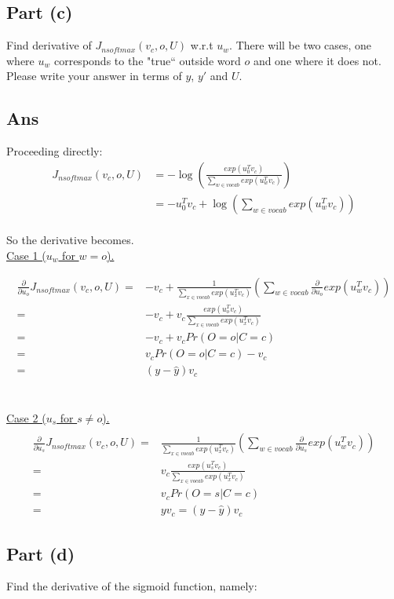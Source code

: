 \documentclass{article}
\begin{document}
\subsection*{Part (c)}
Find derivative of $J_{nsoftmax}(v_c, o, U)$ w.r.t $u_w$. There will be two cases, one where $u_w$ corresponds to the "true`` outside word $o$ and one where it does not. Please write your answer in terms of $y$, $y'$ and $U$.

\subsection*{Ans}
Proceeding directly:
\begin{align*}J_{nsoftmax}(v_c, o, U) &= -\log \left( \frac{exp(u_0^T v_c)}{\sum_{w \in vocab} exp(u_w^T v_c)  }    \right) \\
&= -u_0^T v_c + \log \left(\sum_{w \in vocab} exp(u_w^T v_c) \right)
\end{align*}
\\ So the derivative becomes.
\\ \underline{Case 1 ($u_w$ for $w=o$).} 

\begin{align*}
\frac{\partial}{\partial u_o} J_{nsoftmax}(v_c, o, U) =& - v_c + \frac{1}{\sum_{x \in vocab} exp(u_x^T v_c)}\left(\sum_{w \in vocab} \frac{\partial}{\partial u_o} exp(u_w^T v_c) \right) \\
=&-v_c + v_c \frac{exp(u_o^T v_c)}{\sum_{x \in vocab} exp(u_x^T v_c)} \\
=& -v_c + v_c Pr(O = o | C = c) \\
=& v_c Pr(O = o | C = c) -v_c \\
=&  (y - \hat{y}) v_c
\end{align*} \\
\\
\underline{Case 2 ($u_s$ for $s \neq o$).} 
\begin{align*}
\\
\frac{\partial}{\partial u_s} J_{nsoftmax}(v_c, o, U) =& \frac{1}{\sum_{x \in vocab} exp(u_x^T v_c)}\left(\sum_{w \in vocab} \frac{\partial}{\partial u_s} exp(u_w^T v_c) \right) \\
=& v_c \frac{exp(u_s^T v_c)}{\sum_{x \in vocab} exp(u_x^T v_c)} \\
=& v_c Pr(O = s | C = c) \\
=&  y v_c = (y - \hat{y}) v_c
\end{align*}

\subsection*{Part (d)}
Find the derivative of the sigmoid function, namely:
\end{document}
